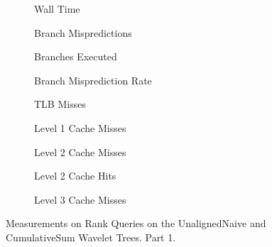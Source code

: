 \begin{figure}\tiny

\begin{subfigure}{0.30\textwidth}
	
	\caption{Wall Time}
	\label{fig:CumulativeSumRankWalltime}
\end{subfigure}
\hfill
\begin{subfigure}{0.30\textwidth}
	
	\caption{Branch Mispredictions}
	\label{fig:CumulativeSumRankBranchMiss}
\end{subfigure}
\hfill
\begin{subfigure}{0.30\textwidth}
	
	\caption{Branches Executed}
	\label{fig:CumulativeSumRankBranchExe}
\end{subfigure}


\begin{subfigure}{0.30\textwidth}
	
	\caption{Branch Misprediction Rate}
	\label{fig:CumulativeSumRankBranchMissRate}
\end{subfigure}
\hfill
\begin{subfigure}{0.30\textwidth}
	
	\caption{TLB Misses}
	\label{fig:CumulativeSumRankTLBMiss}
\end{subfigure}
\hfill
\begin{subfigure}{0.30\textwidth}
	
	\caption{Level 1 Cache Misses}
	\label{fig:CumulativeSumRankL1CM}
\end{subfigure}

\begin{subfigure}{0.30\textwidth}
	
	\caption{Level 2 Cache Misses}
	\label{fig:CumulativeSumRankL2CM}
\end{subfigure}
\hfill
\begin{subfigure}{0.30\textwidth}
	
\caption{Level 2 Cache Hits}
\label{fig:CumulativeSumRankL2CHits}
\end{subfigure}
\hfill
%	
\begin{subfigure}{0.30\textwidth}
	
	\caption{Level 3 Cache Misses}
	\label{fig:CumulativeSumRankL3CM}
\end{subfigure}

\caption{Measurements on Rank Queries on the UnalignedNaive and CumulativeSum Wavelet Trees. Part 1.}
\label{fig:CumulativeSumRank}
\end{figure}





